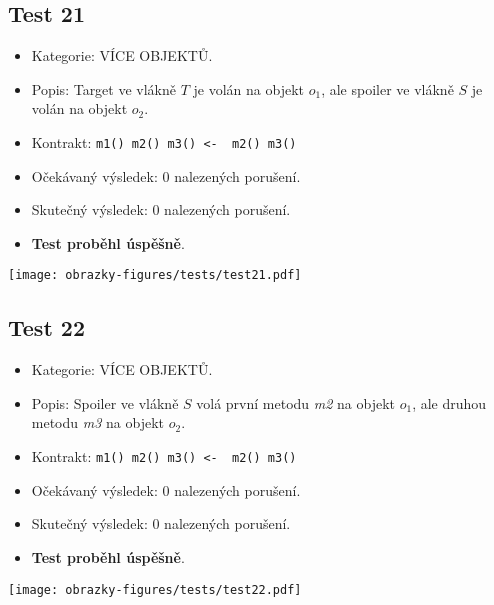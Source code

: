 \subsection*{Test 21}
\begin{itemize}
\item Kategorie: VÍCE OBJEKTŮ.
\item Popis: Target ve vlákně $T$ je volán na objekt $o_1$, ale spoiler ve vlákně $S$ je volán na objekt $o_2$.
\item Kontrakt: \texttt{m1() m2() m3() <- { m2() m3()}}
\item Očekávaný výsledek: 0 nalezených porušení.

\item Skutečný výsledek: 0 nalezených porušení.
\item \textbf{Test proběhl úspěšně}.
\end{itemize}
\begin{center}
    \centering
    \texttt{[image: obrazky-figures/tests/test21.pdf]}
    \label{test21}
\end{center}

\subsection*{Test 22}
\begin{itemize}
\item Kategorie: VÍCE OBJEKTŮ.
\item Popis: Spoiler ve vlákně $S$ volá první metodu \textit{m2} na objekt $o_1$, ale druhou metodu \textit{m3} na objekt $o_2$.
\item Kontrakt: \texttt{m1() m2() m3() <- { m2() m3()}}
\item Očekávaný výsledek: 0 nalezených porušení.

\item Skutečný výsledek: 0 nalezených porušení.
\item \textbf{Test proběhl úspěšně}.
\end{itemize}
\begin{center}
    \centering
    \texttt{[image: obrazky-figures/tests/test22.pdf]}
    \label{test22}
\end{center}

